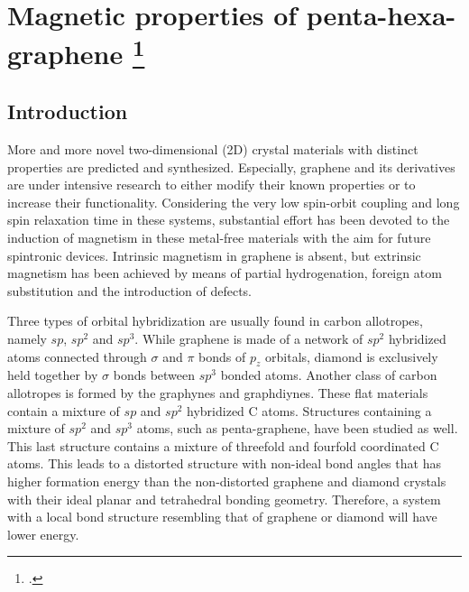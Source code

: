 \section[Magnetic properties of penta-hexa-graphene]{Magnetic properties of penta-hexa-graphene \footcite[This work is published in:][]{Aierken2016.magnetism}}

\subsection{Introduction}

More and more novel two-dimensional (2D) crystal materials with distinct properties are predicted and synthesized. Especially, graphene\cite{Novoselov666,Geim2007} and its derivatives \cite{Vasilios2012,Inagaki2014} are under intensive research to either modify their known properties or to increase their functionality. Considering the very low spin-orbit coupling and long spin relaxation time in these systems, substantial effort has been devoted to the induction of magnetism in these metal-free materials with the aim for future spintronic devices\cite{KAN2008,Kun2015}. Intrinsic magnetism in graphene is absent, but extrinsic magnetism has been achieved by means of partial hydrogenation\cite{Zhou2009,Eng2013}, foreign atom substitution\cite{Okada2001,Miao2016} and the introduction of defects\cite{Pereira2006,Yazyev2007}. 

Three types of orbital hybridization are usually found in carbon allotropes, namely $sp$, $sp^2$ and $sp^3$.  While graphene is made of a network of $sp^2$ hybridized atoms connected through $\sigma$ and $\pi$ bonds of $p_z$ orbitals, diamond is exclusively held together by $\sigma$ bonds between $sp^3$ bonded atoms. Another class of carbon allotropes is formed by the graphynes and graphdiynes\cite{Baughman1987,Ivanovskii20131}. These flat materials contain a mixture of $sp$ and $sp^2$ hybridized C atoms. Structures containing a mixture of $sp^2$ and $sp^3$ atoms, such as penta-graphene\cite{Zhang2015}, have been studied as well. This last structure contains a mixture of threefold and fourfold coordinated C atoms. This leads to a distorted structure with non-ideal bond angles that has higher formation energy than the non-distorted graphene and diamond crystals with their ideal planar and tetrahedral bonding geometry. Therefore, a system with a local bond structure resembling that of graphene or diamond will have lower energy. 

